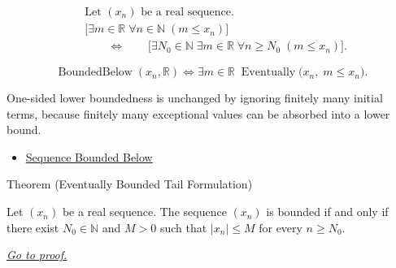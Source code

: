 \begin{remark*}
\[
\begin{aligned}
&\text{Let } (x_n) \text{ be a real sequence.}\\
&\bigl[
\exists m \in \mathbb{R}\;
\forall n \in \mathbb{N}\;(m \le x_n)
\bigr]\\
&\qquad\Longleftrightarrow\qquad
\bigl[
\exists N_0 \in \mathbb{N}\;
\exists m \in \mathbb{R}\;
\forall n \ge N_0\;(m \le x_n)
\bigr].
\end{aligned}
\]
\end{remark*}

\begin{remark*}
\[
\operatorname{BoundedBelow}(x_n,\mathbb{R})
\Longleftrightarrow
\exists m \in \mathbb{R}\;
\operatorname{Eventually}\bigl(x_n,\; m \le x_n\bigr).
\]
\end{remark*}

\begin{remark*}[Interpretation]
One-sided lower boundedness is unchanged by ignoring finitely many initial
terms, because finitely many exceptional values can be absorbed into a lower
bound.
\end{remark*}

\begin{dependencies}
\begin{itemize}
  \item \hyperref[def:sequence-bounded-below]{Sequence Bounded Below}
\end{itemize}
\end{dependencies}


\begin{theorembox}{Theorem (Eventually Bounded Tail Formulation)}
\begin{theorem}
\label{thm:eventually-bounded-tail-formulation}
Let $(x_n)$ be a real sequence. The sequence $(x_n)$ is bounded if and only
if there exist $N_0 \in \mathbb{N}$ and $M > 0$ such that $|x_n| \le M$ for
every $n \ge N_0$.

\smallskip
\noindent
\hyperref[prf:eventually-bounded-tail-formulation]{\textit{Go to proof.}}
\end{theorem}
\end{theorembox}


